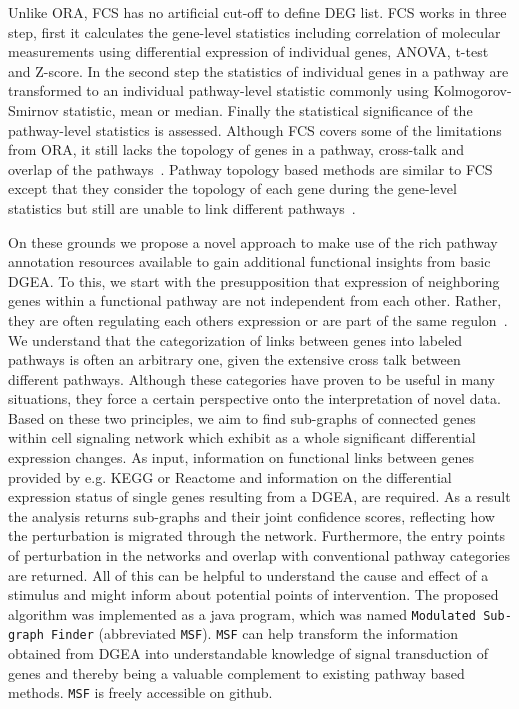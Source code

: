\documentclass[10pt,a4paper,twocolumn]{article}
\begin{document}
Unlike ORA, FCS has no artificial cut-off to define DEG list. FCS
works in three step, first it calculates the gene-level statistics
including correlation of molecular measurements using differential
expression of individual genes, ANOVA, t-test and Z-score. In the
second step the statistics of individual genes in a pathway are
transformed to an individual pathway-level statistic commonly using
Kolmogorov-Smirnov statistic, mean or median. Finally the statistical
significance of the pathway-level statistics is assessed. Although FCS
covers some of the limitations from ORA, it still lacks the topology
of genes in a pathway, cross-talk and overlap of the
pathways~\cite{Khatri2012,Campos}. Pathway topology based methods are
similar to FCS except that they consider the topology of each gene
during the gene-level statistics but still are unable to link
different pathways~\cite{Khatri2012}.

On these grounds we propose a novel approach to make use of the rich
pathway annotation resources available to gain additional functional
insights from basic DGEA. To this, we start with the presupposition
that expression of neighboring genes within a functional pathway are
not independent from each other. Rather, they are often regulating
each others expression or are part of the same
regulon~\cite{Michalak}. We understand that the categorization of
links between genes into labeled pathways is often an arbitrary one,
given the extensive cross talk between different pathways. Although
these categories have proven to be useful in many situations, they
force a certain perspective onto the interpretation of novel
data. Based on these two principles, we aim to find sub-graphs of
connected genes within cell signaling network which exhibit as a whole
significant differential expression changes. As input, information on
functional links between genes provided by e.g. KEGG or Reactome and
information on the differential expression status of single genes
resulting from a DGEA, are required. As a result the analysis returns
sub-graphs and their joint confidence scores, reflecting how the
perturbation is migrated through the network. Furthermore, the entry
points of perturbation in the networks and overlap with conventional
pathway categories are returned. All of this can be helpful to
understand the cause and effect of a stimulus and might inform about
potential points of intervention. The proposed algorithm was
implemented as a java program, which was named \texttt{Modulated Sub-graph
Finder} (abbreviated \texttt{MSF}). \texttt{MSF} can help transform the
information obtained from DGEA into understandable knowledge of signal
transduction of genes and thereby being a valuable complement to existing
pathway based methods. \texttt{MSF} is freely accessible on github.
\end{document}
